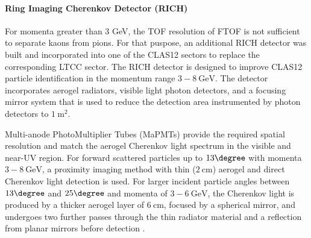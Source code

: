 \paragraph{Ring Imaging Cherenkov Detector (RICH)}
    For momenta greater than 3 GeV, the TOF resolution of FTOF is not sufficient to separate kaons from pions.
    For that puspose, an additional RICH detector was built and incorporated into one of the CLAS12 sectors to replace the corresponding LTCC sector.
    The RICH detector is designed to improve CLAS12 particle identification in the momentum range $3 - 8 ~\text{GeV}$.
    The detector incorporates aerogel radiators, visible light photon detectors, and a focusing mirror system that is used to reduce the detection area instrumented by photon detectors to $1 ~\text{m}^2$.

    Multi-anode PhotoMultiplier Tubes (MaPMTs) provide the required spatial resolution and match the aerogel Cherenkov light spectrum in the visible and near-UV region.
    For forward scattered particles up to $13\degree$ with momenta $3 - 8 ~\text{GeV}$, a proximity imaging method with thin ($2 ~\text{cm}$) aerogel and direct Cherenkov light detection is used.
    For larger incident particle angles between $13\degree$ and $25\degree$ and momenta of $3 - 6 ~\text{GeV}$, the Cherenkov light is produced by a thicker aerogel layer of $6 ~\text{cm}$, focused by a spherical mirror, and undergoes two further passes through the thin radiator material and a reflection from planar mirrors before detection \cite{contalbrigo2020}.
